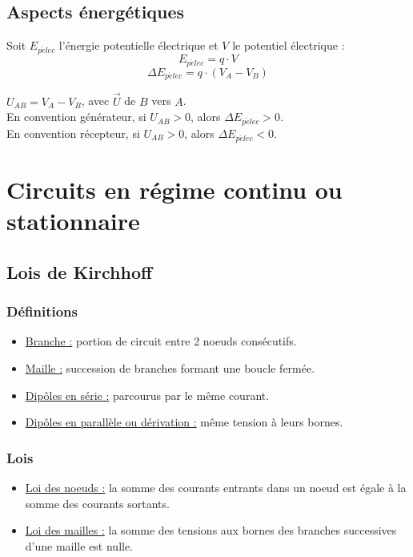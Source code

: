 \documentclass[13pt, twoside, a4paper, french]{report}
\begin{document}
    \section{Aspects énergétiques}\label{sec:aspects-energetiques}

    Soit $E_{p\acute elec}$ l'énergie potentielle électrique et $V$ le potentiel électrique :
    \begin{equation}
        E_{p\acute elec} = q \cdot V\label{eq:equation1}
    \end{equation}
    \begin{equation}
        \Delta E_{p\acute elec} = q \cdot (V_A - V_B) \label{eq:equation2}
    \end{equation}

    $U_{AB} = V_A - V_B$, avec $\vec U$ de $B$ vers $A$.\\
    En convention générateur, si $U_{AB} > 0$, alors $\Delta E_{p\acute elec} > 0$.\\
    En convention récepteur, si $U_{AB} > 0$, alors $\Delta E_{p\acute elec} < 0$.


    \chapter{Circuits en régime continu ou stationnaire}\label{ch:circuits-en-regime-continu-ou-stationnaire}


    \section{Lois de Kirchhoff}\label{sec:lois-de-kirchhoff}

    \subsection{Définitions}\label{subsec:definitions}
    \begin{itemize}
        \item \underline{Branche :} portion de circuit entre 2 noeuds consécutifs.
        \item \underline{Maille :} succession de branches formant une boucle fermée.
        \item \underline{Dipôles en série :} parcourus par le même courant.
        \item \underline{Dipôles en parallèle ou dérivation :} même tension à leurs bornes.
    \end{itemize}

    \subsection{Lois}\label{subsec:lois}
    \begin{itemize}
        \item \underline{Loi des noeuds :} la somme des courants entrants dans un noeud est égale à la somme des courants sortants.
        \item \underline{Loi des mailles :} la somme des tensions aux bornes des branches successives d'une maille est nulle.
    \end{itemize}
\end{document}

